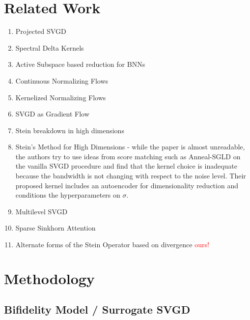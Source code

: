 \documentclass[12pt]{article}
\renewcommand{\[}{\left[}
\renewcommand{\]}{\right]}
\renewcommand{\(}{\left(}
\renewcommand{\)}{\right)}
\begin{document}
\section{Related Work}

\begin{enumerate}
    \item Projected SVGD \cite{chen_projected_2020}

    \item Spectral Delta Kernels \cite{lazaro-gredilla_sparse_2010}

    \item Active Subspace based reduction for BNNs \cite{jantre_learning_2023}

    \item Continuous Normalizing Flows \cite{grathwohl_ffjord_2018}

    \item Kernelized Normalizing Flows \cite{english_kernelised_2024}

    \item SVGD as Gradient Flow \cite{liu_stein_2017}

    \item Stein breakdown in high dimensions \cite{ba_towards_2019}

    \item Stein's Method for High Dimensions \cite{chang_kernel_2020} - while the paper is almost unreadable, the authors try to use ideas from score matching such as Anneal-SGLD on the vanilla SVGD procedure and find that the kernel choice is inadequate because the bandwidth is not changing with respect to the noise level. Their proposed kernel includes an autoencoder for dimensionality reduction and conditions the hyperparameters on $\sigma$.

    \item Multilevel SVGD \cite{alsup_multilevel_2022}

    \item Sparse Sinkhorn Attention \cite{tay_sparse_2020}

    \item Alternate forms of the Stein Operator based on divergence \textcolor{red}{ours!}
\end{enumerate}

\section{Methodology}

\subsection{Bifidelity Model / Surrogate SVGD}
\end{document}
